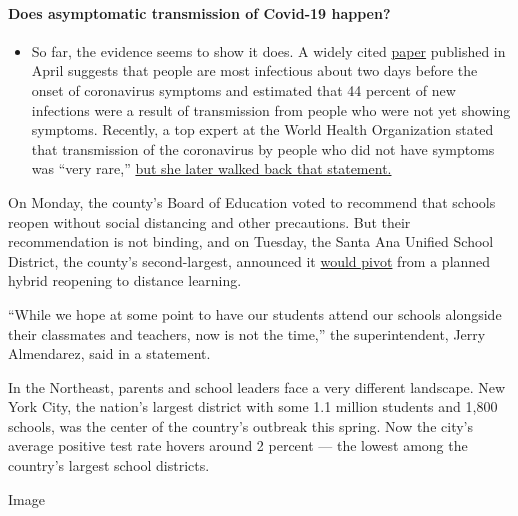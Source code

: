 \begin{itemize}
{  \paragraph{Does asymptomatic transmission of Covid-19
  happen?}\label{does-asymptomatic-transmission-of-covid-19-happen}}

  \begin{itemize}
  \tightlist
  \item
    So far, the evidence seems to show it does. A widely cited
    \href{https://www.nature.com/articles/s41591-020-0869-5}{paper}
    published in April suggests that people are most infectious about
    two days before the onset of coronavirus symptoms and estimated that
    44 percent of new infections were a result of transmission from
    people who were not yet showing symptoms. Recently, a top expert at
    the World Health Organization stated that transmission of the
    coronavirus by people who did not have symptoms was ``very rare,''
    \href{https://www.nytimes3xbfgragh.onion/2020/06/09/world/coronavirus-updates.html?action=click\&pgtype=Article\&state=default\&region=MAIN_CONTENT_3\&context=storylines_faq\#link-1f302e21}{but
    she later walked back that statement.}
  \end{itemize}
\end{itemize}

On Monday, the county's Board of Education voted to recommend that
schools reopen without social distancing and other precautions. But
their recommendation is not binding, and on Tuesday, the Santa Ana
Unified School District, the county's second-largest, announced it
\href{https://www.sausd.us/site/default.aspx?PageType=3\&DomainID=1\&ModuleInstanceID=6157\&ViewID=6446EE88-D30C-497E-9316-3F8874B3E108\&RenderLoc=0\&FlexDataID=96385\&PageID=1}{would
pivot} from a planned hybrid reopening to distance learning.

``While we hope at some point to have our students attend our schools
alongside their classmates and teachers, now is not the time,'' the
superintendent, Jerry Almendarez, said in a statement.

In the Northeast, parents and school leaders face a very different
landscape. New York City, the nation's largest district with some 1.1
million students and 1,800 schools, was the center of the country's
outbreak this spring. Now the city's average positive test rate hovers
around 2 percent --- the lowest among the country's largest school
districts.

Image


